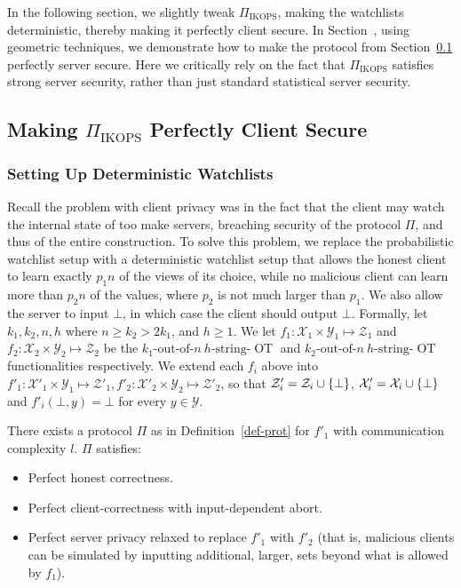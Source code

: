 \documentclass{llncs}
\newcommand{\OT}{\operatorname{OT}}
\newcommand{\sOT}[3]{#1\text{-out-of-}#2~#3\text{-string-}\OT}
\newcommand{\X}{\mathcal{X}}
\newcommand{\Y}{\mathcal{Y}}
\renewcommand{\Z}{\mathcal{Z}}
\newcommand{\IKOPS}{\operatorname{IKOPS}}
\begin{document}
In the following section, we slightly tweak $\Pi_{\IKOPS}$, making the watchlists deterministic, thereby making it perfectly client secure. In Section~\cite{sec-serv-perf}, using geometric techniques, we demonstrate how to make the protocol from Section~\ref{sec-client-pr} perfectly server secure. Here we critically rely on the fact that $\Pi_{\IKOPS}$ satisfies strong server security, rather than just standard statistical server security. 

\subsection{Making $\Pi_{\IKOPS}$ Perfectly Client Secure}\label{sec-client-pr}

\subsubsection{Setting Up Deterministic Watchlists}
Recall the problem with client privacy was in the fact that the client may watch the internal state of too make servers, breaching security of the protocol $\Pi$, and thus of the entire construction.
To solve this problem, we replace the probabilistic watchlist setup with a deterministic watchlist setup that allows the honest client to learn exactly $p_1n$ of the views of its choice, while no malicious client can learn more than $p_2n$ of the values, where $p_2$ is not much larger than $p_1$. We also allow the server to input $\bot$, in which case the client should output $\bot$. Formally, let $k_1,k_2,n,h$ where $n\geq k_2 > 2k_1$, and $h\geq 1$. We let $f_1:\X_1\times\Y_1\mapsto\Z_1$ and $f_2:\X_2\times\Y_2\mapsto\Z_2$ be the $\sOT{k_1}{n}{h}$ and $\sOT{k_2}{n}{h}$ functionalities respectively. We extend each $f_i$ above into $f'_1:\X'_1\times\Y_1\mapsto\Z'_1,f'_2:\X'_2\times\Y_2\mapsto\Z'_2$, so that $\Z'_i=\Z_i\cup\set{\bot}$, $\X'_i=\X_i\cup\set{\bot}$ and $f'_i(\bot,y)=\bot$ for every $y\in\Y$.

\begin{theorem}[a $\sOT{(k_1,k_2)}{n}{h}$ protocol]
	There exists a protocol $\Pi$ as in Definition~\ref{def-prot} for $f'_1$ with communication complexity $l$. $\Pi$ satisfies:
	\begin{itemize}
	\item Perfect honest correctness.
	\item Perfect client-correctness with input-dependent abort.
	\item Perfect server privacy relaxed to replace $f'_1$ with $f'_2$ (that is, malicious clients can be simulated by inputting additional, larger, sets beyond what is allowed by $f_1$).
	 \end{itemize} 
\end{theorem}
\end{document}

